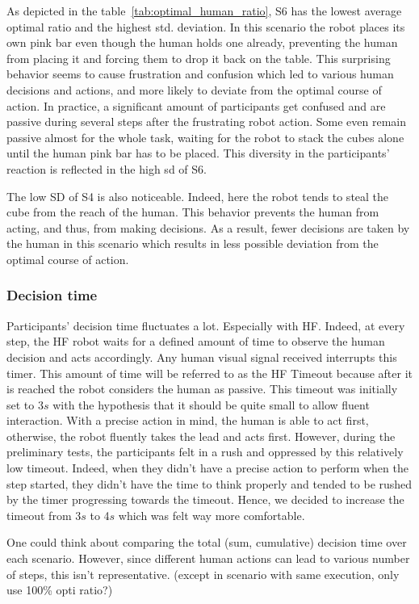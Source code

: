 As depicted in the table~\ref{tab:optimal_human_ratio}, 
S6 has the lowest average optimal ratio and the highest std. deviation. In this scenario the robot places its own pink bar even though the human holds one already, preventing the human from placing it and forcing them to drop it back on the table. This surprising behavior seems to cause frustration and confusion which led to various human decisions and actions, and more likely to deviate from the optimal course of action. In practice, a significant amount of participants get confused and are passive during several steps after the frustrating robot action. Some even remain passive almost for the whole task, waiting for the robot to stack the cubes alone until the human pink bar has to be placed. This diversity in the participants' reaction is reflected in the high sd of S6.

The low SD of S4 is also noticeable. Indeed, here the robot tends to steal the cube from the reach of the human. This behavior prevents the human from acting, and thus, from making decisions. As a result, fewer decisions are taken by the human in this scenario which results in less possible deviation from the optimal course of action.

\subsubsection*{Decision time}
Participants' decision time fluctuates a lot. Especially with HF. Indeed, at every step, the HF robot waits for a defined amount of time to observe the human decision and acts accordingly. Any human visual signal received interrupts this timer. This amount of time will be referred to as the HF Timeout because after it is reached the robot considers the human as passive. This timeout was initially set to 3$s$ with the hypothesis that it should be quite small to allow fluent interaction. With a precise action in mind, the human is able to act first, otherwise, the robot fluently takes the lead and acts first. However, during the preliminary tests, the participants felt in a rush and oppressed by this relatively low timeout. Indeed, when they didn't have a precise action to perform when the step started, they didn't have the time to think properly and tended to be rushed by the timer progressing towards the timeout. Hence, we decided to increase the timeout from 3$s$ to 4$s$ which was felt way more comfortable. 

One could think about comparing the total (sum, cumulative) decision time over each scenario. However, since different human actions can lead to various number of steps, this isn't representative. (except in scenario with same execution, only use 100\% opti ratio?)

